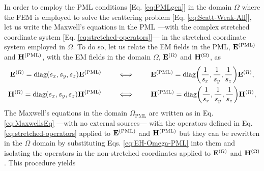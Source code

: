    In order to employ the PML conditions [Eq. \eqref{eq:PMLgen}] in the domain $\Omega$ where the FEM is employed to solve the scattering problem [Eq. \eqref{eq:Scatt-Weak-All}], let us write the Maxwell's equations in the PML ---with the complex stretched coordinate system [Eq. \eqref{eq:stretched-operators}]--- in the stretched coordinate system employed in $\Omega$. To do so, let us relate the EM fields in the PML, $\vb{E}^\text{(PML)}$ and $\vb{H}^\text{(PML)}$, with the EM fields in the domain $\Omega$, $\vb{E}^{(\Omega)}$ and $\vb{H}^{(\Omega)}$,  as \cite{jin_theory_2010}
   \begin{subequations}
       \label{eq:EH-Omega-PML}
   \begin{align}
        \vb{E}^{(\Omega)} = \text{diag}(s_x,s_y,s_z)\vb{E}^\text{(PML)}
            \qquad
            &\iff
            \qquad
         \vb{E}^\text{(PML)} = \text{diag}\qty(\frac{1}{s_x},\frac{1}{s_y},\frac{1}{s_z})\vb{E}^{(\Omega)},
       \label{eq:E-Omega-PML}
    \\
       \vb{H}^{(\Omega)} = \text{diag}(s_x,s_y,s_z)\vb{H}^\text{(PML)}
            \qquad
             &\iff
            \qquad
       \vb{H}^\text{(PML)} = \text{diag}\qty(\frac{1}{s_x},\frac{1}{s_y},\frac{1}{s_z})\vb{H}^{(\Omega)},
       \label{eq:H-Omega-PML}
   \end{align}
    \end{subequations}
    The Maxwell's equations in the domain $\Omega_\text{PML}$ are written as in Eq. \eqref{eq:MaxwellsEq} ---with no external sources--- with the operators defined in Eq. \eqref{eq:stretched-operators} applied to $\vb{E}^\text{(PML)}$ and $\vb{H}^\text{(PML)}$ but they can be rewritten in the $\Omega$ domain by substituting  Eqs. \eqref{eq:EH-Omega-PML} into them and isolating the operators in the non-stretched coordinates applied to $\vb{E}^{(\Omega)}$ and $\vb{H}^{(\Omega)}$. This procedure yields \cite{jin_theory_2010}
